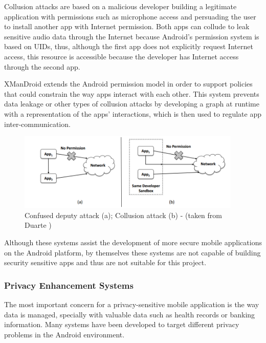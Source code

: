 Collusion attacks are based on a malicious developer building a legitimate application with permissions such as microphone access and persuading the user to install another app with Internet permission. Both apps can collude to leak sensitive audio data through the Internet because Android's permission system is based on UIDs, thus, although the first app does not explicitly request Internet access, this resource is accessible because the developer has Internet access through the second app.

XManDroid \cite{bugiel2011xmandroid} extends the Android permission model in order to support policies that could constrain the way apps interact with each other. This system prevents data leakage or other types of collusion attacks by developing a graph at runtime with a representation of the apps’ interactions, which is then used to regulate app inter-communication.

\begin{figure}[t!]
	\centering
	\includegraphics[width=0.95\textwidth]{img/communicationattacks.png}
	\caption{Confused deputy attack (a); Collusion attack (b) - (taken from Duarte \cite{nunoduarte})}
	\label{fig:communicationattacks}
\end{figure}

Although these systems assist the development of more secure mobile applications on the Android platform, by themselves these systems are not capable of building security sensitive apps and thus are not suitable for this project.

\subsubsection{Privacy Enhancement Systems}
\label{sec:privacyenhancement}

The most important concern for a privacy-sensitive mobile application is the way data is managed, specially with valuable data such as health records or banking information. Many systems have been developed to target different privacy problems in the Android environment.

